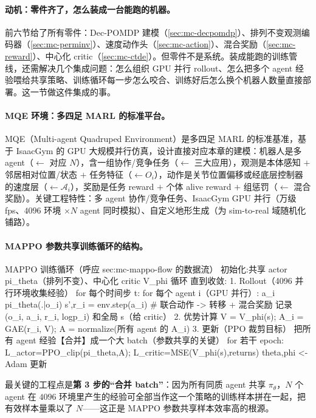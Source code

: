 \paragraph{动机：零件齐了，怎么装成一台能跑的机器。}
前六节给了所有零件：Dec-POMDP 建模（\cref{sec:mc-decpomdp}）、排列不变观测编码器（\cref{sec:mc-perminv}）、速度动作头（\cref{sec:mc-action}）、混合奖励（\cref{sec:mc-reward}）、中心化 critic（\cref{sec:mc-ctde}）。但零件不是系统。装成能跑的训练管线，还需解决几个集成问题：怎么组织 GPU 并行 rollout、怎么把多个 agent 经验喂给共享策略、训练循环每一步怎么咬合、训练好后怎么换个机器人数量直接部署。这一节做这件集成的事。

\paragraph{MQE 环境：多四足 MARL 的标准平台。}
MQE（Multi-agent Quadruped Environment）是多四足 MARL 的标准基准，基于 IsaacGym 的 GPU 大规模并行仿真\cite{xiong2024mqe}，设计直接对应本章的建模：机器人是多 agent（$\leftarrow$ 对应 $N$），含一组协作/竞争任务（$\leftarrow$ 三大应用），观测是本体感知 $+$ 邻居相对位置/状态 $+$ 任务特征（$\leftarrow O_i$），动作是关节位置偏移或经底层控制器的速度层（$\leftarrow\mathcal{A}_i$），奖励是任务 reward $+$ 个体 alive reward $+$ 组惩罚（$\leftarrow$ 混合奖励）。关键工程特性：多 agent 协作/竞争任务、IsaacGym GPU 并行（万级 fps、$4096$ 环境 $\times N$ agent 同时模拟）、自定义地形生成（为 sim-to-real 域随机化铺路）。

\paragraph{MAPPO 参数共享训练循环的结构。}
\begin{codebox}[text]{MAPPO 训练循环（呼应 sec:mc-mappo-flow 的数据流）}
初始化:共享 actor pi_theta（排列不变）、中心化 critic V_phi
循环 直到收敛:
  1. Rollout（4096 并行环境收集经验）
       for 每个时间步 t:  for 每个 agent i（GPU 并行）:  a_i ~ pi_theta(.|o_i)
       s',{r_i} = env.step({a_i})            # 联合动作 -> 转移 + 混合奖励
       记录 (o_i, a_i, r_i, logp_i) 和全局 s（给 critic）
  2. 优势计算
       V = V_phi(s);  A_i = GAE(r_i, V);  A = normalize(所有 agent 的 A_i)
  3. 更新（PPO 裁剪目标）
       把所有 agent 经验【合并】成一个大 batch（参数共享的关键）
       for 若干 epoch:  L_actor=PPO_clip(pi_theta,A);  L_critic=MSE(V_phi(s),returns)
                        theta,phi <- Adam 更新
\end{codebox}
\noindent 最关键的工程点是\textbf{第 3 步的“合并 batch”}：因为所有同质 agent 共享 $\pi_\theta$，$N$ 个 agent 在 $4096$ 环境里产生的经验可全部当作这一个策略的训练样本拼在一起，把有效样本量乘以了 $N$——这正是 MAPPO 参数共享样本效率高的根源。

